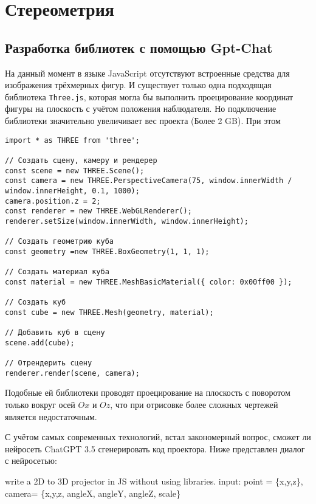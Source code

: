 \section{Стереометрия}\label{2sect}
\subsection{Разработка библиотек с помощью Gpt-Chat}

На данный момент в языке JavaScript отсутствуют встроенные средства для изображения трёхмерных фигур. И существует только одна подходящая библиотека \texttt{Three.js}, которая могла бы выполнить проецирование координат фигуры на плоскость с учётом положения наблюдателя. Но подключение библиотеки значительно увеличивает вес проекта (Более 2 GB). При этом 

\begin{lstlisting}
import * as THREE from 'three';

// Создать сцену, камеру и рендерер
const scene = new THREE.Scene();
const camera = new THREE.PerspectiveCamera(75, window.innerWidth / window.innerHeight, 0.1, 1000);
camera.position.z = 2;
const renderer = new THREE.WebGLRenderer();
renderer.setSize(window.innerWidth, window.innerHeight);

// Создать геометрию куба
const geometry =new THREE.BoxGeometry(1, 1, 1);

// Создать материал куба
const material = new THREE.MeshBasicMaterial({ color: 0x00ff00 });

// Создать куб
const cube = new THREE.Mesh(geometry, material);

// Добавить куб в сцену
scene.add(cube);

// Отрендерить сцену
renderer.render(scene, camera);

\end{lstlisting}


Подобные ей библиотеки проводят проецирование на плоскость с поворотом только вокруг осей $Ox$ и $Oz$, что при отрисовке более сложных чертежей является недостаточным.

С учётом самых современных технологий, встал закономерный вопрос, сможет ли нейросеть ChatGPT 3.5 сгенерировать код проектора. Ниже представлен диалог с нейросетью:

\begin{leftBox}
	write a 2D to 3D projector in JS without using libraries. input:  point = \{x,y,z\}, camera= \{x,y,z, angleX, angleY, angleZ, scale\}
\end{leftBox}

